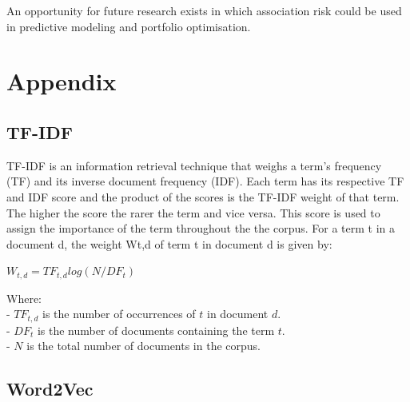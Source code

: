 \documentclass[11pt]{article}
\begin{document}
An opportunity for future research exists in which association risk
could be used in predictive modeling and portfolio optimisation.

    \hypertarget{appendix}{%
\section{Appendix}\label{appendix}}

\hypertarget{tf-idf}{%
\subsection{TF-IDF}\label{tf-idf}}

TF-IDF is an information retrieval technique that weighs a term's
frequency (TF) and its inverse document frequency (IDF). Each term has
its respective TF and IDF score and the product of the scores is the
TF-IDF weight of that term. The higher the score the rarer the term and
vice versa. This score is used to assign the importance of the term
throughout the the corpus. For a term t in a document d, the weight Wt,d
of term t in document d is given by:

\(W_{t,d} = TF_{t,d} log(N/DF_{t})\)

Where:\\
- \(TF_{t,d}\) is the number of occurrences of \(t\) in document
\(d\).\\
- \(DF_{t}\) is the number of documents containing the term \(t\).\\
- \(N\) is the total number of documents in the corpus.

\hypertarget{word2vec}{%
\subsection{Word2Vec}\label{word2vec}}
\end{document}
